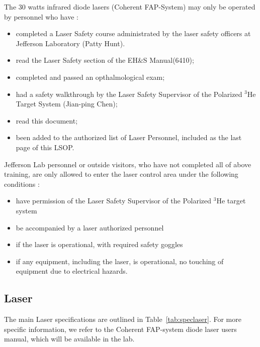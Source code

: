 {The 30 watts infrared diode lasers (Coherent FAP-System) may only be operated by
personnel who have :
\begin {itemize}
\item completed a Laser Safety course administrated by the laser safety officers at
Jefferson Laboratory (Patty Hunt).
\item read the Laser Safety section of the EH\&S Manual(6410);
\item  completed and passed an opthalmological exam;
\item had a safety walkthrough by the Laser Safety Supervisor of the 
Polarized $^3$He Target System (Jian-ping Chen);
\item read this document;
\item been added to the authorized list of Laser Personnel, included as the 
last page of this LSOP.
\end {itemize}
Jefferson Lab personnel or outside visitors, who have not completed all of 
above training, are
only allowed to enter the laser control area under the following conditions :
\begin {itemize}
\item have permission of the Laser Safety
Supervisor of the Polarized $^3$He target system
\item be accompanied by a laser authorized personnel
\item if the laser is operational, with required safety
goggles
\item if any equipment, including the laser, is operational, no touching of
equipment due to electrical hazards.
\end {itemize}


\subsection{Laser}

The main Laser specifications are outlined in Table~\ref{tab:speclaser}. For more specific
information, we refer to the Coherent FAP-system diode laser users manual, 
which will be available in the lab.

}
